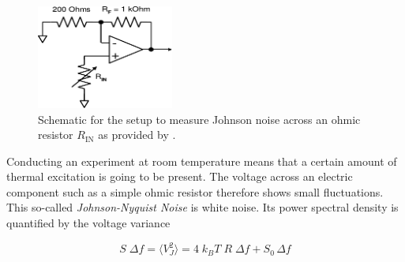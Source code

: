 \documentclass[
    parskip=half, 
    twoside=false,
    twocolumn=true,
    fontsize=11pt,
]{scrarticle}
\begin{document}
\begin{figure}
    \centering
    \includegraphics[width=0.4\textwidth]{figures/measure_R_setup_part1.pdf}
    \caption{
        Schematic for the setup to measure Johnson noise across an ohmic resistor $R_\text{IN}$ as provided by \autocite{instructions}.
    }
    \label{fig:johnson setup R}
\end{figure}


Conducting an experiment at room temperature means that a certain amount of thermal excitation is going to be present. The voltage across an electric component such as a simple ohmic resistor therefore shows small fluctuations. This so-called \textit{Johnson-Nyquist Noise} is white noise. Its power spectral density is quantified by the voltage variance

\begin{equation}
    \label{eq:johnson noise}
    S\;\Delta f = \langle V_J^2 \rangle = 4\; k_B T\; R\; \Delta f + S_0\, \Delta f
\end{equation} 
\end{document}
